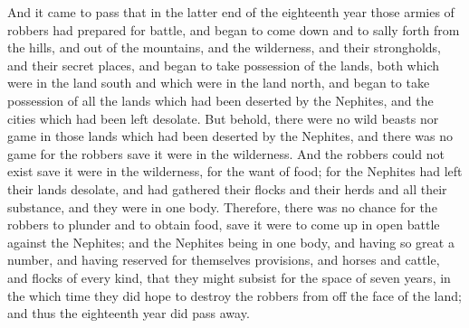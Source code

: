 And it came to pass that in the latter end of the eighteenth year those armies of robbers had prepared for battle, and began to come down and to sally forth from the hills, and out of the mountains, and the wilderness, and their strongholds, and their secret places, and began to take possession of the lands, both which were in the land south and which were in the land north, and began to take possession of all the lands which had been deserted by the Nephites, and the cities which had been left desolate.
\bverse \iffalse But behold, there were no wild beasts nor game in those lands which had been deserted by the Nephites, and there was no game for the robbers save it were in the wilderness. \fi
But behold, there were no wild beasts nor game in those lands which had been deserted by the Nephites, and there was no game for the robbers save it were in the wilderness.
\bverse \iffalse And the robbers could not exist save it were in the wilderness, for the want of food; for the Nephites had left their lands desolate, and had gathered their flocks and their herds and all their substance, and they were in one body. \fi
And the robbers could not exist save it were in the wilderness, for the want of food; for the Nephites had left their lands desolate, and had gathered their flocks and their herds and all their substance, and they were in one body.
\bverse \iffalse Therefore, there was no chance for the robbers to plunder and to obtain food, save it were to come up in open battle against the Nephites; and the Nephites being in one body, and having so great a number, and having reserved for themselves provisions, and horses and cattle, and flocks of every kind, that they might subsist for the space of seven years, in the which time they did hope to destroy the robbers from off the face of the land; and thus the eighteenth year did pass away. \fi
Therefore, there was no chance for the robbers to plunder and to obtain food, save it were to come up in open battle against the Nephites; and the Nephites being in one body, and having so great a number, and having reserved for themselves provisions, and horses and cattle, and flocks of every kind, that they might subsist for the space of seven years, in the which time they did hope to destroy the robbers from off the face of the land; and thus the eighteenth year did pass away.
\bverse \iffalse And it came to pass that in the nineteenth year Giddianhi found that it was expedient that he should go up to battle against the Nephites, for there was no way that they could subsist save it were to plunder and rob and murder. \fi
